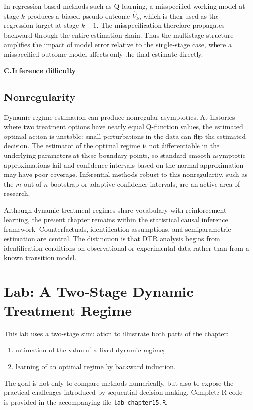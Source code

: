 \documentclass[master.tex]{subfiles}
\begin{document}
In regression-based methods such as Q-learning, a misspecified working model at stage $k$ produces a biased pseudo-outcome $\widehat{V}_k$, which is then used as the regression target at stage $k-1$. The misspecification therefore propagates backward through the entire estimation chain. Thus the multistage structure amplifies the impact of model error relative to the single-stage case, where a misspecified outcome model affects only the final estimate directly.

\medskip
\noindent\textbf{C.\enspace Inference difficulty}
\medskip

\subsection{Nonregularity}

Dynamic regime estimation can produce nonregular asymptotics. At histories where two treatment options have nearly equal Q-function values, the estimated optimal action is unstable: small perturbations in the data can flip the estimated decision. The estimator of the optimal regime is not differentiable in the underlying parameters at these boundary points, so standard smooth asymptotic approximations fail and confidence intervals based on the normal approximation may have poor coverage. Inferential methods robust to this nonregularity, such as the $m$-out-of-$n$ bootstrap or adaptive confidence intervals, are an active area of research.

\begin{remark}
Although dynamic treatment regimes share vocabulary with reinforcement learning, the present chapter remains within the statistical causal inference framework. Counterfactuals, identification assumptions, and semiparametric estimation are central. The distinction is that DTR analysis begins from identification conditions on observational or experimental data rather than from a known transition model.
\end{remark}

\section{Lab: A Two-Stage Dynamic Treatment Regime}
\label{w15:sec:lab}

This lab uses a two-stage simulation to illustrate both parts of the chapter:
\begin{enumerate}
  \item estimation of the value of a fixed dynamic regime;
  \item learning of an optimal regime by backward induction.
\end{enumerate}
The goal is not only to compare methods numerically, but also to expose the practical challenges introduced by sequential decision making. Complete R code is provided in the accompanying file \texttt{lab\_chapter15.R}.
\end{document}
